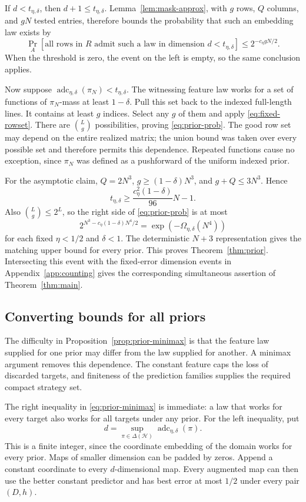 \documentclass[11pt,letterpaper,pmlr,twoside]{jmlr}
\newcommand{\Hc}{\mathcal H}
\newcommand{\adc}{\operatorname{adc}}
\begin{document}
If $d<t_{\eta,\delta}$, then $d+1\le t_{\eta,\delta}$. Lemma~\ref{lem:mask-approx}, with $g$ rows, $Q$ columns, and $gN$ tested entries, therefore bounds the probability that such an embedding law exists by
\begin{equation}
 \Pr_A[\text{all rows in }R\text{ admit such a law in dimension }d<t_{\eta,\delta}]
 \le 2^{-c_\eta gN/2}.
 \label{eq:fixed-rowset}
\end{equation}
When the threshold is zero, the event on the left is empty, so the same conclusion applies.

Now suppose $\adc_{\eta,\delta}(\pi_N)<t_{\eta,\delta}$. The witnessing feature law works for a set of functions of $\pi_N$-mass at least $1-\delta$. Pull this set back to the indexed full-length lines. It contains at least $g$ indices. Select any $g$ of them and apply \eqref{eq:fixed-rowset}. There are $\binom{L}{g}$ possibilities, proving \eqref{eq:prior-prob}. The good row set may depend on the entire realized matrix; the union bound was taken over every possible set and therefore permits this dependence. Repeated functions cause no exception, since $\pi_N$ was defined as a pushforward of the uniform indexed prior.

For the asymptotic claim, $Q=2N^3$, $g\ge(1-\delta)N^3$, and $g+Q\le3N^3$. Hence
\[
 t_{\eta,\delta}\ge\frac{c_\eta^2(1-\delta)}{96}N-1.
\]
Also $\binom Lg\le2^L$, so the right side of \eqref{eq:prior-prob} is at most
\[
 2^{N^3-c_\eta(1-\delta)N^4/2}
 =\exp(-\Omega_{\eta,\delta}(N^4))
\]
for each fixed $\eta<1/2$ and $\delta<1$. The deterministic $N+3$ representation gives the matching upper bound for every prior. This proves Theorem~\ref{thm:prior}. Intersecting this event with the fixed-error dimension events in Appendix~\ref{app:counting} gives the corresponding simultaneous assertion of Theorem~\ref{thm:main}.

\subsection{Converting bounds for all priors}
The difficulty in Proposition~\ref{prop:prior-minimax} is that the feature law supplied for one prior may differ from the law supplied for another. A minimax argument removes this dependence. The constant feature caps the loss of discarded targets, and finiteness of the prediction families supplies the required compact strategy set.

The right inequality in \eqref{eq:prior-minimax} is immediate: a law that works for every target also works for all targets under any prior. For the left inequality, put
\[
 d=\sup_{\pi\in\Delta(\Hc)}\adc_{\eta,\delta}(\pi).
\]
This is a finite integer, since the coordinate embedding of the domain works for every prior. Maps of smaller dimension can be padded by zeros. Append a constant coordinate to every $d$-dimensional map. Every augmented map can then use the better constant predictor and has best error at most $1/2$ under every pair $(D,h)$.
\end{document}
